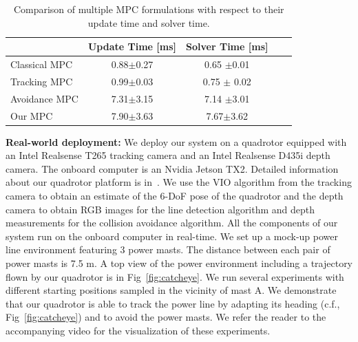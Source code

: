 %
\begin{table}[b!]
	\centering
	\begin{tabular}{lcccl}
	\toprule
	&\textbf{Update Time [ms]}&\textbf{Solver Time [ms]}\\
	\midrule
	Classical MPC&0.88$\pm$0.27 & 0.65 $\pm$0.01\\
	Tracking MPC & 0.99$\pm$0.03 & 0.75 $\pm$ 0.02\\
	Avoidance MPC &7.31$\pm$3.15&7.14 $\pm$3.01\\
	Our MPC&7.90$\pm$3.63&7.67$\pm$3.62\\
	\bottomrule
\end{tabular}
\vspace{1ex}
\caption{Comparison of multiple MPC formulations with respect to their update time and solver time.}
\vspace{-2.5ex}

\label{tab:mpc_run_time}
\end{table}
\textbf{Real-world deployment:}
We deploy our system on a quadrotor equipped with an Intel Realsense T265 tracking camera and an Intel Realsense D435i depth camera. The onboard computer is an Nvidia Jetson TX2. Detailed information about our quadrotor platform is in~\cite{foehn2022agilicious}. We use the VIO algorithm from the tracking camera to obtain an estimate of the 6-DoF pose of the quadrotor and the depth camera to obtain RGB images for the line detection algorithm and depth measurements for the collision avoidance algorithm. All the components of our system run on the onboard computer in real-time. We set up a mock-up power line environment featuring 3 power masts. The distance between each pair of power masts is 7.5 m. A top view of the power environment including a trajectory flown by our quadrotor is in Fig~\ref{fig:catcheye}. We run several experiments with different starting positions sampled in the vicinity of mast A.  We demonstrate that our quadrotor is able to track the power line by adapting its heading (c.f., Fig~\ref{fig:catcheye}) and to avoid the power masts. We refer the reader to the accompanying video for the visualization of these experiments.
